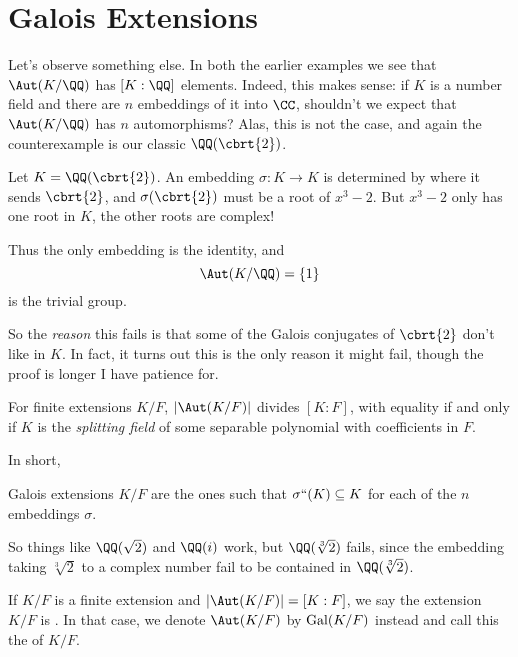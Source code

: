 \section{Galois Extensions}
Let's observe something else.
In both the earlier examples we see that $\Aut(K/\QQ)$ has $[K : \QQ]$ elements.
Indeed, this makes sense: if $K$ is a number field and there are $n$ embeddings of it into $\CC$,
shouldn't we expect that $\Aut(K/\QQ)$ has $n$ automorphisms?
Alas, this is not the case, and again the counterexample is our classic $\QQ(\cbrt{2})$.
\begin{example}
	Let $K = \QQ(\cbrt{2})$.
	An embedding $\sigma : K \to K$ is determined by where it sends $\cbrt{2}$,
	and $\sigma(\cbrt{2})$ must be a root of $x^3-2$.
	But $x^3-2$ only has one root in $K$,
	the other roots are complex!

	Thus the only embedding is the identity, and
	\[ \Aut(K/\QQ) = \{1\} \]
	is the trivial group.
\end{example}
So the \emph{reason} this fails is that some of the Galois conjugates of $\cbrt{2}$
don't like in $K$.
In fact, it turns out this is the only reason it might fail,
though the proof is longer I have patience for.
\begin{theorem}
	For finite extensions $K/F$, 
	$\left\lvert \Aut(K/F) \right\rvert$ divides $[K:F]$,
	with equality if and only if $K$ is the \emph{splitting field}
	of some separable polynomial with coefficients in $F$.
	\label{thm:Galois_splitting}
\end{theorem}
In short,
\begin{moral}
	Galois extensions $K/F$ are the ones such that $\sigma``(K) \subseteq K$
	for each of the $n$ embeddings $\sigma$.
\end{moral}
So things like $\QQ(\sqrt 2)$ and $\QQ(i)$ work, but $\QQ(\sqrt[3]{2})$ fails,
since the embedding taking $\sqrt[3]{2}$ to a complex number fail to be contained in $\QQ(\sqrt[3]{2})$.

\begin{definition}
	If $K/F$ is a finite extension and $\left\lvert \Aut(K/F) \right\rvert = [K:F]$,
	we say the extension $K/F$ is .
	In that case, we denote $\Aut(K/F)$ by $\operatorname{Gal}(K/F)$ instead
	and call this the  of $K/F$.
\end{definition}

